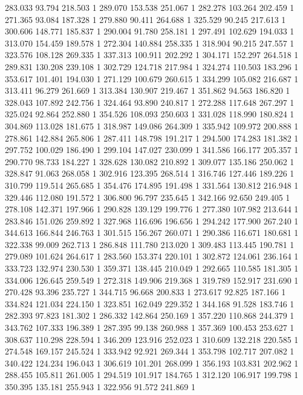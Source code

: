 	283.033	93.794	218.503	1
	289.070	153.538	251.067	1
	282.278	103.264	202.459	1
	271.365	93.084	187.328	1
	279.880	90.411	264.688	1
	325.529	90.245	217.613	1
	300.606	148.771	185.837	1
	290.004	91.780	258.181	1
	297.491	102.629	194.033	1
	313.070	154.459	189.578	1
	272.304	140.884	258.335	1
	318.904	90.215	247.557	1
	323.576	108.128	269.335	1
	337.313	100.911	202.292	1
	304.171	152.297	264.518	1
	289.831	130.208	239.108	1
	302.729	124.718	217.984	1
	324.274	110.503	183.296	1
	353.617	101.401	194.030	1
	271.129	100.679	260.615	1
	334.299	105.082	216.687	1
	313.411	96.279	261.669	1
	313.384	130.907	219.467	1
	351.862	94.563	186.820	1
	328.043	107.892	242.756	1
	324.464	93.890	240.817	1
	272.288	117.648	267.297	1
	325.024	92.864	252.880	1
	354.526	108.093	250.603	1
	331.028	118.990	180.824	1
	304.869	113.028	181.675	1
	318.987	149.086	264.309	1
	335.942	109.972	200.888	1
	278.861	142.884	265.806	1
	287.411	148.798	191.217	1
	294.500	174.283	181.382	1
	297.752	100.029	186.490	1
	299.104	147.027	230.099	1
	341.586	166.177	205.357	1
	290.770	98.733	184.227	1
	328.628	130.082	210.892	1
	309.077	135.186	250.062	1
	328.847	91.063	268.058	1
	302.916	123.395	268.514	1
	316.746	127.446	189.226	1
	310.799	119.514	265.685	1
	354.476	174.895	191.498	1
	331.564	130.812	216.948	1
	329.446	112.080	191.572	1
	306.800	96.797	235.645	1
	342.166	92.650	249.405	1
	278.108	142.371	197.966	1
	290.828	139.129	199.776	1
	277.380	107.982	213.644	1
	283.846	151.026	259.892	1
	327.968	116.696	196.656	1
	294.242	177.900	267.240	1
	344.613	166.844	246.763	1
	301.515	156.267	260.071	1
	290.386	116.671	180.681	1
	322.338	99.009	262.713	1
	286.848	111.780	213.020	1
	309.483	113.445	190.781	1
	279.089	101.624	264.617	1
	283.560	153.374	220.101	1
	302.872	124.061	236.164	1
	333.723	132.974	230.530	1
	359.371	138.445	210.049	1
	292.665	110.585	181.305	1
	334.006	126.645	259.549	1
	272.318	149.906	219.368	1
	319.789	152.917	231.690	1
	270.428	93.396	235.727	1
	344.715	96.668	200.833	1
	273.617	92.825	187.166	1
	334.824	121.034	224.150	1
	323.851	162.049	229.352	1
	344.168	91.528	183.746	1
	282.393	97.823	181.302	1
	286.332	142.864	250.169	1
	357.220	110.868	244.379	1
	343.762	107.333	196.389	1
	287.395	99.138	260.988	1
	357.369	100.453	253.627	1
	308.637	110.298	228.594	1
	346.209	123.916	252.023	1
	310.609	132.218	220.585	1
	274.548	169.157	245.524	1
	333.942	92.921	269.344	1
	353.798	102.717	207.082	1
	340.422	124.234	196.043	1
	306.619	101.201	268.099	1
	356.193	103.831	202.962	1
	288.455	105.811	261.005	1
	294.519	101.917	184.765	1
	312.120	106.917	199.798	1
	350.395	135.181	255.943	1
	322.956	91.572	241.869	1

